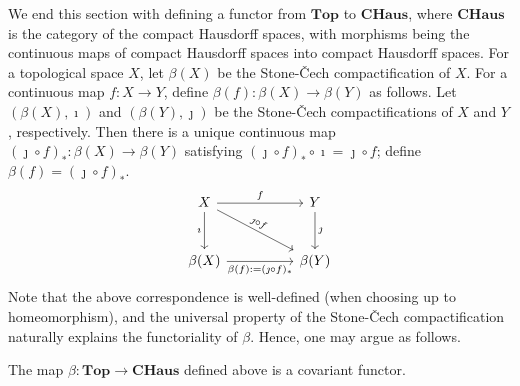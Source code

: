 We end this section with defining a functor from $\textbf{Top}$ to $\textbf{CHaus}$, where $\textbf{CHaus}$ is the category of the compact Hausdorff spaces, with morphisms being the continuous maps of compact Hausdorff spaces into compact Hausdorff spaces.
For a topological space $X$, let $\beta(X)$ be the Stone-\v{C}ech compactification of $X$.
For a continuous map $f: X\rightarrow Y$, define $\beta(f): \beta(X)\rightarrow\beta(Y)$ as follows.
Let $(\beta(X), \imath)$ and $(\beta(Y), \jmath)$ be the Stone-\v{C}ech compactifications of $X$ and $Y$, respectively.
Then there is a unique continuous map $(\jmath\circ f)_*: \beta(X)\rightarrow\beta(Y)$ satisfying $(\jmath\circ f)_*\circ\imath=\jmath\circ f$; define $\beta(f)=(\jmath\circ f)_*$.
\begin{equation*}
\begin{tikzcd}[row sep=large, column sep=huge]
    X
    \arrow[r, "f"]
    \arrow[d, "\imath"']
    \arrow[dr, "\jmath\circ f"{sloped}]
    &
    Y
    \arrow[d, "\jmath"]
    \\
    \beta(X)
    \arrow[r, "\beta(f):=(\jmath\circ f)_*"']
    &
    \beta(Y)
\end{tikzcd}
\end{equation*}
Note that the above correspondence is well-defined (when choosing up to homeomorphism), and the universal property of the Stone-\v{C}ech compactification naturally explains the functoriality of $\beta$.
Hence, one may argue as follows.
\begin{prop}
    The map $\beta: \textbf{Top}\rightarrow\textbf{CHaus}$ defined above is a covariant functor.
\end{prop}